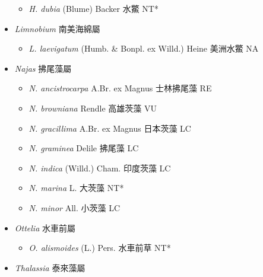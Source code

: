 \begin{itemize}
  \begin{itemize}
        \item[] \textit{H. dubia} (Blume) Backer  水鱉   NT*
  \end{itemize}
 \item[] \textit{Limnobium} 南美海綿屬
                                
  \begin{itemize}
        \item[] \textit{L. laevigatum} (Humb. \& Bonpl. ex Willd.) Heine  美洲水鱉   NA
  \end{itemize}
 \item[] \textit{Najas} 拂尾藻屬
                                
  \begin{itemize}
        \item[] \textit{N. ancistrocarpa} A.Br. ex Magnus  士林拂尾藻   RE
        \item[] \textit{N. browniana} Rendle  高雄茨藻   VU
        \item[] \textit{N. gracillima} A.Br. ex Magnus  日本茨藻   LC
        \item[] \textit{N. graminea} Delile  拂尾藻   LC
        \item[] \textit{N. indica} (Willd.) Cham.  印度茨藻   LC
        \item[] \textit{N. marina} L.  大茨藻   NT*
        \item[] \textit{N. minor} All.  小茨藻   LC
  \end{itemize}
 \item[] \textit{Ottelia} 水車前屬
                                
  \begin{itemize}
        \item[] \textit{O. alismoides} (L.) Pers.  水車前草   NT*
  \end{itemize}
 \item[] \textit{Thalassia} 泰來藻屬
                                

\end{itemize}
